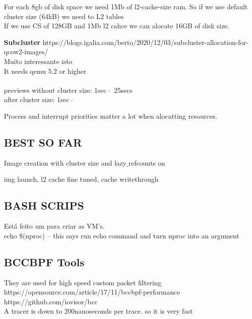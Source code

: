 \documentclass[11pt, a4paper, oneside]{article}
\theoremstyle{definition}
\begin{document}
For each 8gb of disk space we need 1Mb of l2-cache-size ram. So if we use default cluster size (64kB) we need to L2 tables\\

If we use CS of 128GB and 1Mb l2 cahce we can alocate 16GB of disk size.

\textbf{Subcluster}
https://blogs.igalia.com/berto/2020/12/03/subcluster-allocation-for-qcow2-images/\\
Muito interessante isto\\
It needs qemu 5.2 or higher\\
\\
previews without cluster size: 1sec $\ \tilde{}\ $ 25secs\\
after cluster size: 1sec $\ \tilde{}\ $ 

Process and interrupt priorities matter a lot when alocatting resources. \\

\subsection{BEST SO FAR}

Image creation with cluster size and lazy$\_$refcounts on

img launch, l2 cache fine tuned, cache writethrough

\vfill
\pagebreak
\subsection{BASH SCRIPS}
Está feito um para criar as VM's.\\

echo $\$$(nproc) -- this says run echo command and turn nproc into an argument

\vfill
\pagebreak
\subsection{BCCBPF Tools}
They are used for high speed custom packet filtering\\

https://opensource.com/article/17/11/bccbpf-performance\\
https://github.com/iovisor/bcc\\

A tracer is down to 200nanoseconds per trace. so it is very fast\\
\end{document}
